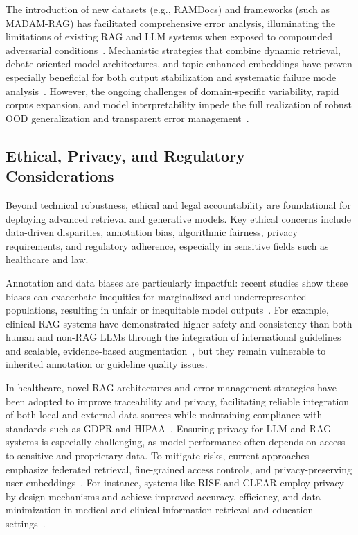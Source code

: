 \documentclass[sigconf]{acmart}
\begin{document}
The introduction of new datasets (e.g., RAMDocs) and frameworks (such as MADAM-RAG) has facilitated comprehensive error analysis, illuminating the limitations of existing RAG and LLM systems when exposed to compounded adversarial conditions~\cite{ref62}. Mechanistic strategies that combine dynamic retrieval, debate-oriented model architectures, and topic-enhanced embeddings have proven especially beneficial for both output stabilization and systematic failure mode analysis~\cite{ref63,ref64}. However, the ongoing challenges of domain-specific variability, rapid corpus expansion, and model interpretability impede the full realization of robust OOD generalization and transparent error management~\cite{ref53,ref54}.

\subsection{Ethical, Privacy, and Regulatory Considerations}

Beyond technical robustness, ethical and legal accountability are foundational for deploying advanced retrieval and generative models. Key ethical concerns include data-driven disparities, annotation bias, algorithmic fairness, privacy requirements, and regulatory adherence, especially in sensitive fields such as healthcare and law.

Annotation and data biases are particularly impactful: recent studies show these biases can exacerbate inequities for marginalized and underrepresented populations, resulting in unfair or inequitable model outputs~\cite{ref2,ref3,ref54}. For example, clinical RAG systems have demonstrated higher safety and consistency than both human and non-RAG LLMs through the integration of international guidelines and scalable, evidence-based augmentation~\cite{ref2,ref3}, but they remain vulnerable to inherited annotation or guideline quality issues.

In healthcare, novel RAG architectures and error management strategies have been adopted to improve traceability and privacy, facilitating reliable integration of both local and external data sources while maintaining compliance with standards such as GDPR and HIPAA~\cite{ref14,ref15,ref24}. Ensuring privacy for LLM and RAG systems is especially challenging, as model performance often depends on access to sensitive and proprietary data. To mitigate risks, current approaches emphasize federated retrieval, fine-grained access controls, and privacy-preserving user embeddings~\cite{ref21,ref55}. For instance, systems like RISE and CLEAR employ privacy-by-design mechanisms and achieve improved accuracy, efficiency, and data minimization in medical and clinical information retrieval and education settings~\cite{ref3,ref55}.
\end{document}
